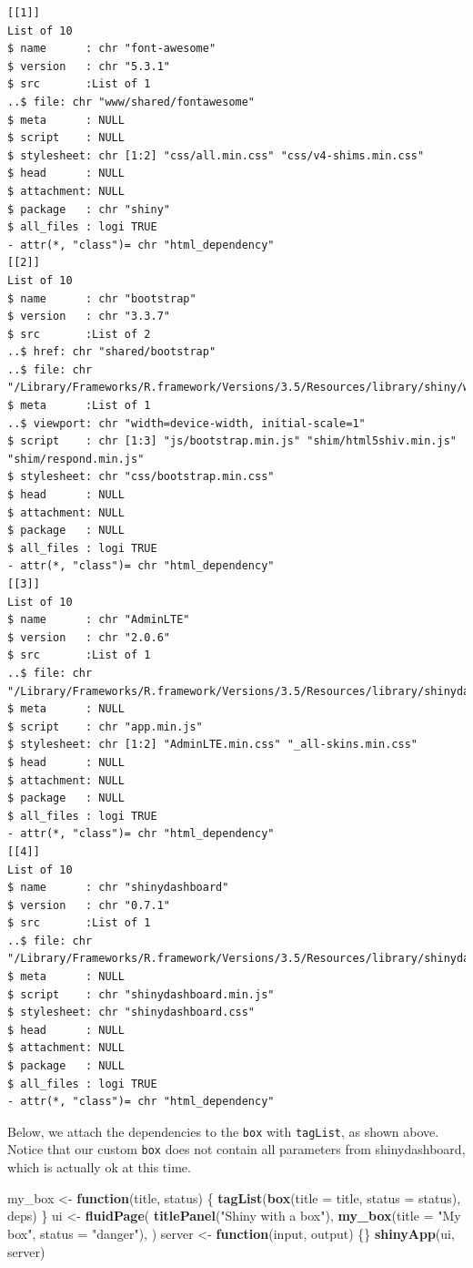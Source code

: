 \documentclass[]{book}
\newenvironment{Shaded}{\begin{snugshade}}{\end{snugshade}}
\newcommand{\ControlFlowTok}[1]{\textcolor[rgb]{0.13,0.29,0.53}{\textbf{#1}}}
\newcommand{\DataTypeTok}[1]{\textcolor[rgb]{0.13,0.29,0.53}{#1}}
\newcommand{\KeywordTok}[1]{\textcolor[rgb]{0.13,0.29,0.53}{\textbf{#1}}}
\newcommand{\NormalTok}[1]{#1}
\newcommand{\StringTok}[1]{\textcolor[rgb]{0.31,0.60,0.02}{#1}}
\begin{document}
\begin{verbatim}
[[1]]
List of 10
$ name      : chr "font-awesome"
$ version   : chr "5.3.1"
$ src       :List of 1
..$ file: chr "www/shared/fontawesome"
$ meta      : NULL
$ script    : NULL
$ stylesheet: chr [1:2] "css/all.min.css" "css/v4-shims.min.css"
$ head      : NULL
$ attachment: NULL
$ package   : chr "shiny"
$ all_files : logi TRUE
- attr(*, "class")= chr "html_dependency"
[[2]]
List of 10
$ name      : chr "bootstrap"
$ version   : chr "3.3.7"
$ src       :List of 2
..$ href: chr "shared/bootstrap"
..$ file: chr "/Library/Frameworks/R.framework/Versions/3.5/Resources/library/shiny/www/shared/bootstrap"
$ meta      :List of 1
..$ viewport: chr "width=device-width, initial-scale=1"
$ script    : chr [1:3] "js/bootstrap.min.js" "shim/html5shiv.min.js" "shim/respond.min.js"
$ stylesheet: chr "css/bootstrap.min.css"
$ head      : NULL
$ attachment: NULL
$ package   : NULL
$ all_files : logi TRUE
- attr(*, "class")= chr "html_dependency"
[[3]]
List of 10
$ name      : chr "AdminLTE"
$ version   : chr "2.0.6"
$ src       :List of 1
..$ file: chr "/Library/Frameworks/R.framework/Versions/3.5/Resources/library/shinydashboard/AdminLTE"
$ meta      : NULL
$ script    : chr "app.min.js"
$ stylesheet: chr [1:2] "AdminLTE.min.css" "_all-skins.min.css"
$ head      : NULL
$ attachment: NULL
$ package   : NULL
$ all_files : logi TRUE
- attr(*, "class")= chr "html_dependency"
[[4]]
List of 10
$ name      : chr "shinydashboard"
$ version   : chr "0.7.1"
$ src       :List of 1
..$ file: chr "/Library/Frameworks/R.framework/Versions/3.5/Resources/library/shinydashboard"
$ meta      : NULL
$ script    : chr "shinydashboard.min.js"
$ stylesheet: chr "shinydashboard.css"
$ head      : NULL
$ attachment: NULL
$ package   : NULL
$ all_files : logi TRUE
- attr(*, "class")= chr "html_dependency"
\end{verbatim}

Below, we attach the dependencies to the \texttt{box} with \texttt{tagList}, as shown above. Notice that our custom \texttt{box} does not contain all parameters from shinydashboard, which is actually ok at this time.

\begin{Shaded}
\begin{Highlighting}[]
\NormalTok{my_box <-}\StringTok{ }\ControlFlowTok{function}\NormalTok{(title, status) \{}
  \KeywordTok{tagList}\NormalTok{(}\KeywordTok{box}\NormalTok{(}\DataTypeTok{title =}\NormalTok{ title, }\DataTypeTok{status =}\NormalTok{ status), deps)}
\NormalTok{\}}
\NormalTok{ui <-}\StringTok{ }\KeywordTok{fluidPage}\NormalTok{(}
  \KeywordTok{titlePanel}\NormalTok{(}\StringTok{"Shiny with a box"}\NormalTok{),}
  \KeywordTok{my_box}\NormalTok{(}\DataTypeTok{title =} \StringTok{"My box"}\NormalTok{, }\DataTypeTok{status =} \StringTok{"danger"}\NormalTok{),}
\NormalTok{)}
\NormalTok{server <-}\StringTok{ }\ControlFlowTok{function}\NormalTok{(input, output) \{\}}
\KeywordTok{shinyApp}\NormalTok{(ui, server)}
\end{Highlighting}
\end{Shaded}
\end{document}
